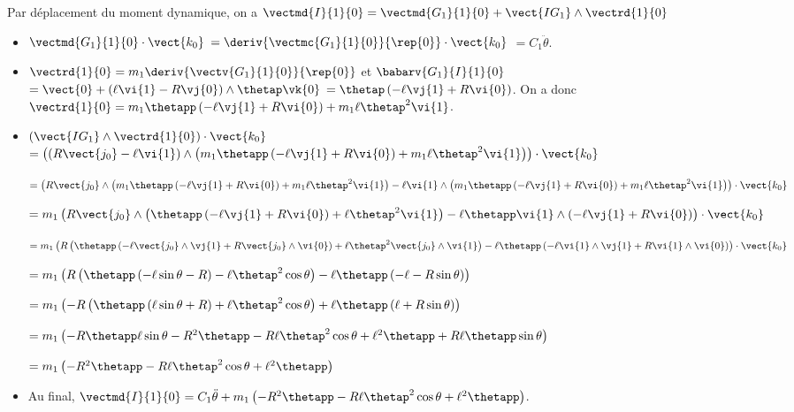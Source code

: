 \begin{corrigebox}
Par déplacement du moment dynamique, on a 
$\vectmd{I}{1}{0} = \vectmd{G_1}{1}{0} + \vect{IG_1}\wedge \vectrd{1}{0}$
\begin{itemize}
\item $\vectmd{G_1}{1}{0}\cdot \vect{k_0} $ $= \deriv{\vectmc{G_1}{1}{0}}{\rep{0}} \cdot \vect{k_0} $ $=C_1 \ddot{\theta}$.
\item $\vectrd{1}{0} = m_1\deriv{\vectv{G_1}{1}{0}}{\rep{0}}$ et  
$\babarv{G_1}{I}{1}{0} $ $=\vect{0}+\left(\ell\vi{1}-R\vj{0} \right)\wedge\thetap \vk{0}$
$=\thetap\left(-\ell\vj{1}+R\vi{0} \right)$. 
On a donc $\vectrd{1}{0} = m_1\thetapp\left(-\ell\vj{1}+R\vi{0} \right)+m_1\ell\thetap^2\vi{1}$.
\item $ \left(\vect{IG_1}\wedge \vectrd{1}{0}\right)  \cdot \vect{k_0}$ 
$ = \left(\left(R\vect{j_0}-\ell\vi{1}\right)\wedge\left( m_1\thetapp\left(-\ell\vj{1}+R\vi{0} \right)+m_1\ell\thetap^2\vi{1}\right)\right)\cdot \vect{k_0}$

$ = \left(R\vect{j_0}\wedge\left( m_1\thetapp\left(-\ell\vj{1}+R\vi{0} \right)+m_1\ell\thetap^2\vi{1}\right)
-\ell\vi{1}\wedge\left( m_1\thetapp\left(-\ell\vj{1}+R\vi{0} \right)+m_1\ell\thetap^2\vi{1}\right)\right)\cdot \vect{k_0}$

$ = m_1\left(R\vect{j_0}\wedge\left( \thetapp\left(-\ell\vj{1}+R\vi{0} \right)+\ell\thetap^2\vi{1}\right)
-\ell \thetapp\vi{1}\wedge\left(-\ell\vj{1}+R\vi{0} \right)\right)\cdot \vect{k_0}$

$ = m_1\left(R\left( \thetapp\left(-\ell\vect{j_0}\wedge\vj{1}+R\vect{j_0}\wedge\vi{0} \right)+\ell\thetap^2\vect{j_0}\wedge\vi{1}\right)
-\ell \thetapp\left(-\ell\vi{1}\wedge\vj{1}+R\vi{1}\wedge\vi{0} \right)\right)\cdot \vect{k_0}$

$ = m_1\left(R\left( \thetapp\left(-\ell\sin\theta-R \right)-\ell\thetap^2\cos\theta\right)
-\ell \thetapp\left(-\ell-R\sin\theta \right)\right)$

$ = m_1\left(-R\left( \thetapp\left(\ell\sin\theta+R \right)+\ell\thetap^2\cos\theta\right)
+\ell \thetapp\left(\ell+R\sin\theta \right)\right)$

$ = m_1\left( -R\thetapp\ell\sin\theta-R^2\thetapp  -R\ell\thetap^2\cos\theta
+\ell^2 \thetapp+R\ell \thetapp\sin\theta \right)$

$ = m_1\left(-R^2\thetapp  -R\ell\thetap^2\cos\theta +\ell^2 \thetapp\right)$

\item Au final, $ \vectmd{I}{1}{0} =C_1 \ddot{\theta} + m_1\left(-R^2\thetapp  -R\ell\thetap^2\cos\theta +\ell^2 \thetapp\right)$.
\end{itemize}


\end{corrigebox}
